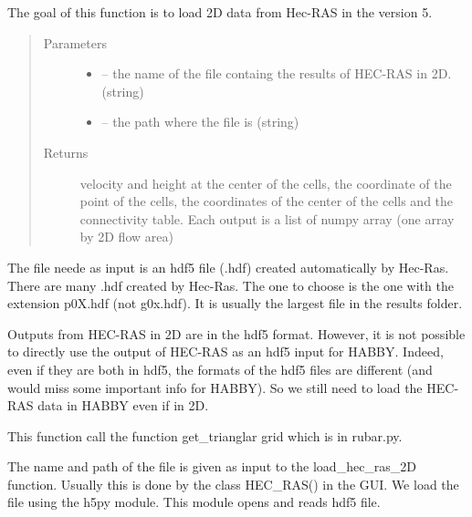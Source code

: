\documentclass[letterpaper,10pt,english]{sphinxmanual}
\begin{document}
\begin{fulllineitems}
\label{\detokenize{index:src.hec_ras2D.load_hec_ras2d}}
The goal of this function is to load 2D data from Hec-RAS in the version 5.
\begin{quote}\begin{description}
\item[{Parameters}] \leavevmode\begin{itemize}
\item {} 
 -- the name of the file containg the results of HEC-RAS in 2D. (string)

\item {} 
 -- the path where the file is (string)

\end{itemize}

\item[{Returns}] \leavevmode
velocity and height at the center of the cells, the coordinate of the point of the cells,
the coordinates of the center of the cells and the connectivity table. Each output is a list of numpy array
(one array by 2D flow area)

\end{description}\end{quote}


The file neede as input is an hdf5 file (.hdf) created automatically by Hec-Ras. There are many .hdf created by
Hec-Ras. The one to choose is the one with the extension p0X.hdf (not g0x.hdf). It is usually the largest file in
the results folder.


Outputs from HEC-RAS in 2D are in the hdf5 format. However, it is not possible to directly use the output of HEC-RAS
as an hdf5 input for HABBY. Indeed, even if they are both in hdf5, the formats of the hdf5 files are different
(and would miss some important info for HABBY).  So we still need to load the HEC-RAS data in HABBY even if in 2D.

This function call the function get\_trianglar grid which is in rubar.py.


The name and path of the file is given as input to the load\_hec\_ras\_2D function. Usually this is done by the class
HEC\_RAS() in the GUI.  We load the file using the h5py module. This module opens and reads hdf5 file.


\end{fulllineitems}
\end{document}
